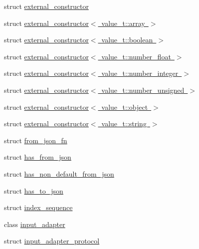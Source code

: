 \begin{DoxyCompactItemize}
struct \mbox{\hyperlink{structnlohmann_1_1detail_1_1external__constructor}{external\+\_\+constructor}}
\item 
struct \mbox{\hyperlink{structnlohmann_1_1detail_1_1external__constructor_3_01value__t_1_1array_01_4}{external\+\_\+constructor$<$ value\+\_\+t\+::array $>$}}
\item 
struct \mbox{\hyperlink{structnlohmann_1_1detail_1_1external__constructor_3_01value__t_1_1boolean_01_4}{external\+\_\+constructor$<$ value\+\_\+t\+::boolean $>$}}
\item 
struct \mbox{\hyperlink{structnlohmann_1_1detail_1_1external__constructor_3_01value__t_1_1number__float_01_4}{external\+\_\+constructor$<$ value\+\_\+t\+::number\+\_\+float $>$}}
\item 
struct \mbox{\hyperlink{structnlohmann_1_1detail_1_1external__constructor_3_01value__t_1_1number__integer_01_4}{external\+\_\+constructor$<$ value\+\_\+t\+::number\+\_\+integer $>$}}
\item 
struct \mbox{\hyperlink{structnlohmann_1_1detail_1_1external__constructor_3_01value__t_1_1number__unsigned_01_4}{external\+\_\+constructor$<$ value\+\_\+t\+::number\+\_\+unsigned $>$}}
\item 
struct \mbox{\hyperlink{structnlohmann_1_1detail_1_1external__constructor_3_01value__t_1_1object_01_4}{external\+\_\+constructor$<$ value\+\_\+t\+::object $>$}}
\item 
struct \mbox{\hyperlink{structnlohmann_1_1detail_1_1external__constructor_3_01value__t_1_1string_01_4}{external\+\_\+constructor$<$ value\+\_\+t\+::string $>$}}
\item 
struct \mbox{\hyperlink{structnlohmann_1_1detail_1_1from__json__fn}{from\+\_\+json\+\_\+fn}}
\item 
struct \mbox{\hyperlink{structnlohmann_1_1detail_1_1has__from__json}{has\+\_\+from\+\_\+json}}
\item 
struct \mbox{\hyperlink{structnlohmann_1_1detail_1_1has__non__default__from__json}{has\+\_\+non\+\_\+default\+\_\+from\+\_\+json}}
\item 
struct \mbox{\hyperlink{structnlohmann_1_1detail_1_1has__to__json}{has\+\_\+to\+\_\+json}}
\item 
struct \mbox{\hyperlink{structnlohmann_1_1detail_1_1index__sequence}{index\+\_\+sequence}}
\item 
class \mbox{\hyperlink{classnlohmann_1_1detail_1_1input__adapter}{input\+\_\+adapter}}
\item 
struct \mbox{\hyperlink{structnlohmann_1_1detail_1_1input__adapter__protocol}{input\+\_\+adapter\+\_\+protocol}}

\end{DoxyCompactItemize}
